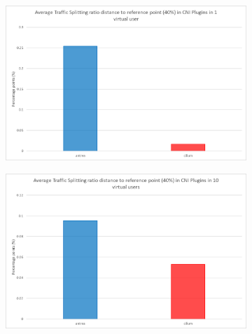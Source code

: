 \begin{figure}[H]
    \centering
    \begin{subfigure}[b]{0.49\textwidth}
        \includegraphics[width=\textwidth]{plots/traffic-splitting/time_window_5_1vu_reference_cloud.png}
        \label{fig:reference_1vu}
        \caption{}
    \end{subfigure}
    \begin{subfigure}[b]{0.49\textwidth}
        \includegraphics[width=\textwidth]{plots/traffic-splitting/time_window_5_10vu_reference_cloud.png}
        \label{fig:reference_10vu}
        \caption{}
    \end{subfigure}

    \vspace{0.5cm}


\end{figure}
